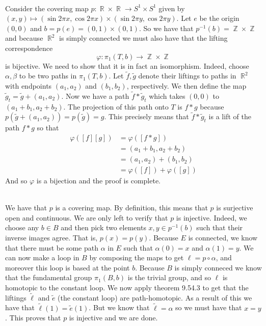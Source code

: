 \documentclass{article}
\DeclareMathOperator{\Z}{\mathbb{Z}}
\DeclareMathOperator{\R}{\mathbb{R}}
\newcommand{\problem}[1]{\noindent{\textbf{Problem #1}}\\}
\begin{document}
\problem{9.54.7} Consider the covering map  $p: \R \times \R \to S^1 \times S^1$ given by $(x,y) \mapsto (\sin2\pi x, \cos2\pi x) \times (\sin2\pi y, \cos2\pi y)$. Let $e$ be the origin $(0,0)$ and $b = p(e) = (0,1) \times (0,1)$. So we have that $p^{-1}(b) = \Z \times \Z$ and because $\R^2$ is simply connected we must also have that the lifting correspondence
\[
\varphi: \pi_1(T,b) \to \Z \times \Z
\]
is bijective. We need to show that it is in fact an isomorphism. Indeed, choose $\alpha, \beta$ to be two paths in $\pi_1(T,b)$. Let $\tilde{f},\tilde{g}$ denote their liftings to paths in $\R^2$ with endpoints $(a_1,a_2)$ and $(b_1,b_2)$, respectively. We then define the map $\tilde{g}_t = \tilde{g} + (a_1,a_2)$. Now we have a path $\tilde{f} * \tilde{g}_t$ which takes $(0,0)$ to $(a_1+b_1, a_2+b_2)$. The projection of this path onto $T$ is $f*g$ because $p(\tilde{g} + (a_1,a_2)) = p(\tilde{g}) = g$. This precisely means that $\tilde{f}*\tilde{g}_t$ is a lift of the path $f*g$ so that
\begin{align*}
\varphi([f][g]) &= \varphi([f*g]) \\
&= (a_1+b_1, a_2+b_2) \\
&= (a_1,a_2) + (b_1,b_2)\\
&= \varphi([f]) + \varphi([g])
\end{align*}
And so $\varphi$ is a bijection and the proof is complete. 

\problem{9.54.8} We have that $p$ is a covering map. By definition, this means that $p$ is surjective open and continuous. We are only left to verify that $p$ is injective. Indeed, we choose any $b \in B$ and then pick two elements $x,y \in p^{-1}(b)$ such that their inverse images agree. That is, $p(x) = p(y)$. Because $E$ is connected, we know that there must be some path $\alpha$ in $E$ such that $\alpha(0) = x$ and $\alpha(1) = y$. We can now make a loop in $B$ by composing the maps to get $\ell = p \circ \alpha$, and moreover this loop is based at the point $b$. Because $B$ is simply conneced we know that the fundamental group $\pi_1(B,b)$ is the trivial group, and so $\ell$ is homotopic to the constant loop. We now apply theorem 9.54.3 to get that the liftings $\tilde{\ell}$ and $\tilde{e}$ (the constant loop) are path-homotopic. As a result of this we have that $\tilde{\ell}(1) = \tilde{e}(1)$. But we know that $\tilde{\ell} = \alpha$ so we must have that $x = y$. This proves that $p$ is injective and we are done. 
\end{document}
